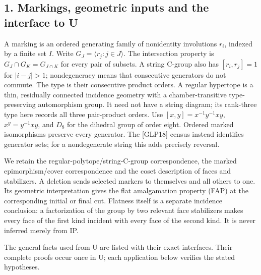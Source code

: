 \documentclass[
  11pt,
  a4paper,
]{article}
\begin{document}
\subsection{1. Markings, geometric inputs and the interface to
U}\label{markings-geometric-inputs-and-the-interface-to-u}

A marking is an ordered generating family of nonidentity involutions
\(r_i\), indexed by a finite set \(I\). Write
\(G_J=\langle r_j:j\in J\rangle\). The intersection property is
\(G_J\cap G_K=G_{J\cap K}\) for every pair of subsets. A string C-group
also has \([r_i,r_j]=1\) for \(|i-j|>1\); nondegeneracy means that
consecutive generators do not commute. The type is their consecutive
product orders. A regular hypertope is a thin, residually connected
incidence geometry with a chamber-transitive type-preserving
automorphism group. It need not have a string diagram; its rank-three
type here records all three pair-product orders. Use
\([x,y]=x^{-1}y^{-1}xy\), \(x^y=y^{-1}xy\), and \(D_8\) for the dihedral
group of order eight. Ordered marked isomorphisms preserve every
generator. The {[}GLP18{]} census instead identifies generator sets; for
a nondegenerate string this adds precisely reversal.

We retain the regular-polytope/string-C-group correspondence, the marked
epimorphism/cover correspondence and the coset description of faces and
stabilizers. A deletion sends selected markers to themselves and all
others to one. Its geometric interpretation gives the flat amalgamation
property (FAP) at the corresponding initial or final cut. Flatness
itself is a separate incidence conclusion: a factorization of the group
by two relevant face stabilizers makes every face of the first kind
incident with every face of the second kind. It is never inferred merely
from IP.

The general facts used from U are listed with their exact interfaces.
Their complete proofs occur once in U; each application below verifies
the stated hypotheses.
\end{document}
